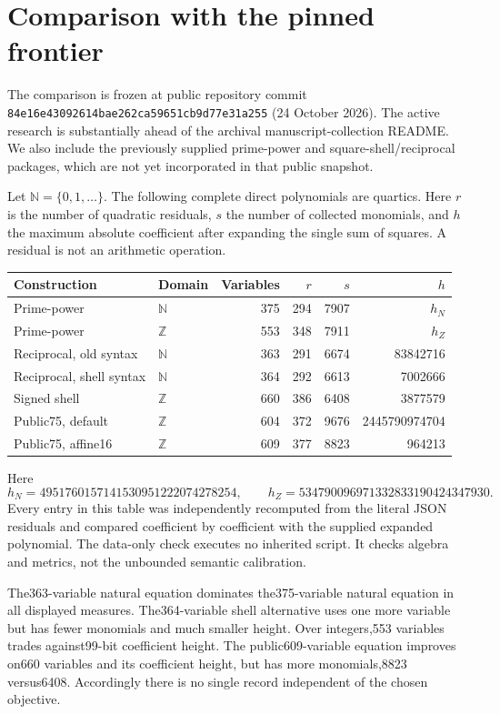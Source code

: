 \section{Comparison with the pinned frontier}
The comparison is frozen at public repository commit
\texttt{84e16e43092614bae262ca59651cb9d77e31a255}
(24 October 2026).  The active research is substantially ahead of the
archival manuscript-collection README.  We also include the previously
supplied prime-power and square-shell/reciprocal packages, which are not
yet incorporated in that public snapshot.

Let $\mathbb N=\{0,1,\ldots\}$.  The following complete direct polynomials
are quartics.  Here $r$ is the number of quadratic residuals, $s$ the
number of collected monomials, and $h$ the maximum absolute coefficient
after expanding the single sum of squares.  A residual is not an
arithmetic operation.
\begin{center}
\small
\begin{tabular}{llrrrr}
Construction & Domain & Variables & $r$ & $s$ & $h$\\
\hline
Prime-power & $\mathbb N$ &375&294&7907&$h_N$\\
Prime-power & $\mathbb Z$ &553&348&7911&$h_Z$\\
Reciprocal, old syntax & $\mathbb N$ &363&291&6674&83842716\\
Reciprocal, shell syntax & $\mathbb N$ &364&292&6613&7002666\\
Signed shell & $\mathbb Z$ &660&386&6408&3877579\\
Public75, default & $\mathbb Z$ &604&372&9676&2445790974704\\
Public75, affine16 & $\mathbb Z$ &609&377&8823&964213
\end{tabular}
\end{center}
Here
\[
h_N=4951760157141530951222074278254,\qquad
h_Z=534790096971332833190424347930.
\]
Every entry in this table was independently recomputed from the literal
JSON residuals and compared coefficient by coefficient with the supplied
expanded polynomial.  The data-only check executes no inherited script.
It checks algebra and metrics, not the unbounded semantic calibration.

The363-variable natural equation dominates the375-variable natural
equation in all displayed measures.  The364-variable shell alternative
uses one more variable but has fewer monomials and much smaller height.
Over integers,553 variables trades against99-bit coefficient height.
The public609-variable equation improves on660 variables and its
coefficient height, but has more monomials,8823 versus6408.  Accordingly
there is no single record independent of the chosen objective.

